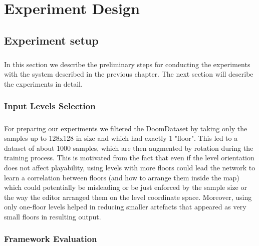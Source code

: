 \chapter{Experiment Design}
\label{ch:experiment}

\paragraph{}


\section{Experiment setup}
\label{sec:experiments}
\paragraph{} In this section we describe the preliminary steps for conducting the experiments with the system described in the previous chapter. The next section will describe the experiments in detail.

\subsection{Input Levels Selection}
\label{sec:InputSelection}
\paragraph{} For preparing our experiments we filtered the DoomDataset by taking only the samples up to 128x128 in size and which had exactly 1 "floor". This led to a dataset of about 1000 samples, which are then augmented by rotation during the training process. This is motivated from the fact that even if the level orientation does not affect playability, using levels with more floors could lead the network to learn a correlation between floors (and how to arrange them inside the map) which could potentially be misleading or be just enforced by the sample size or the way the editor arranged them on the level coordinate space. Moreover, using only one-floor levels helped in reducing smaller artefacts that appeared as very small floors in resulting output.



\subsection{Framework Evaluation}
\label{sec:modelevaluation}
